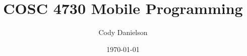 \title{COSC 4730 Mobile Programming} %
\def\homework{Program 1}
\def\github{github repo: \url{cosc4730fa24/mp_program1-cojoda.git}}
\author{Cody Danielson}
\date{\today}